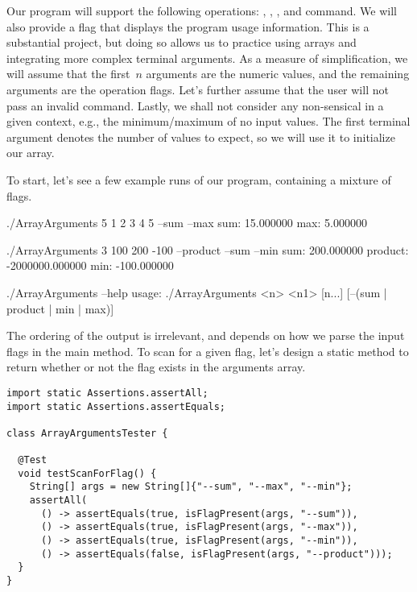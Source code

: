 Our program will support the following operations: , , , and  command. 
We will also provide a  flag that displays the program usage information. 
This is a substantial project, but doing so allows us to practice using arrays and integrating more complex terminal arguments. 
As a measure of simplification, we will assume that the first~$n$ arguments are the numeric values, and the remaining arguments are the operation flags. 
Let's further assume that the user will not pass an invalid command. 
Lastly, we shall not consider any non-sensical in a given context, e.g., the minimum/maximum of no input values. 
The first terminal argument denotes the number of values to expect, so we will use it to initialize our array.

To start, let's see a few example runs of our program, containing a mixture of flags.

\begin{verbnobox}[\small]
./ArrayArguments 5 1 2 3 4 5 --sum --max
sum: 15.000000
max: 5.000000

./ArrayArguments 3 100 200 -100 --product --sum --min
sum: 200.000000
product: -2000000.000000
min: -100.000000

./ArrayArguments --help
usage: ./ArrayArguments <n> <n1> [n...] [--(sum | product | min | max)]
\end{verbnobox}

The ordering of the output is irrelevant, and depends on how we parse the input flags in the main method. 
To scan for a given flag, let's design a static method to return whether or not the flag exists in the arguments array.

\begin{lstlisting}[language=MyJava]
import static Assertions.assertAll;
import static Assertions.assertEquals;

class ArrayArgumentsTester {

  @Test
  void testScanForFlag() {
    String[] args = new String[]{"--sum", "--max", "--min"};
    assertAll(
      () -> assertEquals(true, isFlagPresent(args, "--sum")),
      () -> assertEquals(true, isFlagPresent(args, "--max")),
      () -> assertEquals(true, isFlagPresent(args, "--min")),
      () -> assertEquals(false, isFlagPresent(args, "--product")));
  }
}
\end{lstlisting}


